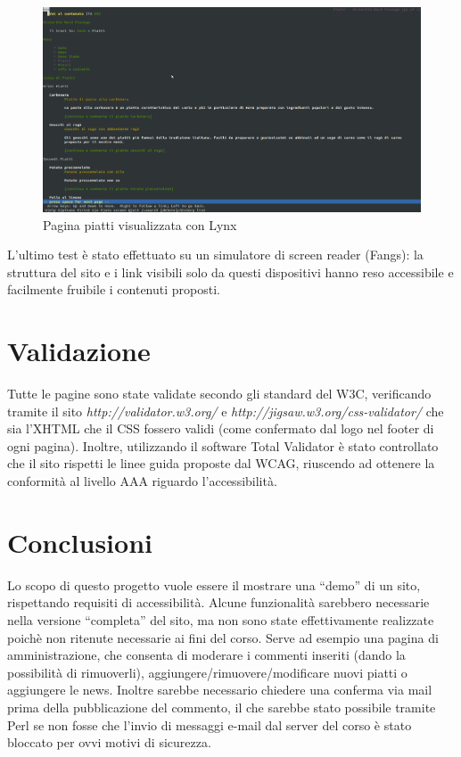 \documentclass[10pt,a4paper,onecolumn]{article}
\begin{document}
\begin{figure}[h]
\centering
\includegraphics[scale=0.20]{piattiLynx}
\caption{Pagina piatti visualizzata con Lynx}
\label{piattiLynx}
\end{figure}

L'ultimo test è stato effettuato su un simulatore di screen reader (Fangs): la struttura del sito e i link visibili solo da questi dispositivi hanno reso accessibile e facilmente fruibile i contenuti proposti.

\section{Validazione}

Tutte le pagine sono state validate secondo gli standard del W3C, verificando tramite il sito \textit{http://validator.w3.org/} e \textit{http://jigsaw.w3.org/css-validator/} che sia l’XHTML che il CSS fossero validi (come confermato dal logo nel footer di ogni pagina).
Inoltre, utilizzando il software Total Validator è stato controllato che il sito rispetti le linee guida proposte dal WCAG, riuscendo ad ottenere la conformità al livello AAA riguardo l’accessibilità.

\section{Conclusioni}

Lo scopo di questo progetto vuole essere il mostrare una ``demo'' di un sito, rispettando requisiti di accessibilità. Alcune funzionalità sarebbero necessarie nella versione “completa” del sito, ma non sono state effettivamente realizzate poichè non ritenute necessarie ai  fini del corso.
Serve ad esempio una pagina di amministrazione, che consenta di moderare i commenti inseriti (dando la possibilità di rimuoverli), aggiungere/rimuovere/modificare nuovi piatti o aggiungere le news. Inoltre sarebbe necessario chiedere una conferma via mail prima della pubblicazione del commento, il che sarebbe stato possibile tramite Perl se non fosse che l’invio di messaggi e-mail dal server del corso è stato bloccato per ovvi motivi di sicurezza.
\end{document}
